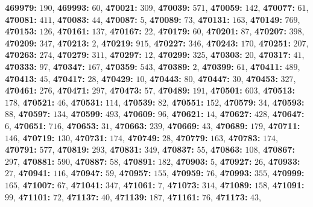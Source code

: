\textsf{\bfseries 469979:} $190$, \textsf{\bfseries 469993:} $60$, \textsf{\bfseries 470021:} $309$, \textsf{\bfseries 470039:} $571$, \textsf{\bfseries 470059:} $142$, \textsf{\bfseries 470077:} $61$, \textsf{\bfseries 470081:} $411$, \textsf{\bfseries 470083:} $44$, \textsf{\bfseries 470087:} $5$, \textsf{\bfseries 470089:} $73$, \textsf{\bfseries 470131:} $163$, \textsf{\bfseries 470149:} $769$, \textsf{\bfseries 470153:} $126$, \textsf{\bfseries 470161:} $137$, \textsf{\bfseries 470167:} $22$, \textsf{\bfseries 470179:} $60$, \textsf{\bfseries 470201:} $87$, \textsf{\bfseries 470207:} $398$, \textsf{\bfseries 470209:} $347$, \textsf{\bfseries 470213:} $2$, \textsf{\bfseries 470219:} $915$, \textsf{\bfseries 470227:} $346$, \textsf{\bfseries 470243:} $170$, \textsf{\bfseries 470251:} $207$, \textsf{\bfseries 470263:} $274$, \textsf{\bfseries 470279:} $311$, \textsf{\bfseries 470297:} $12$, \textsf{\bfseries 470299:} $325$, \textsf{\bfseries 470303:} $20$, \textsf{\bfseries 470317:} $41$, \textsf{\bfseries 470333:} $97$, \textsf{\bfseries 470347:} $167$, \textsf{\bfseries 470359:} $543$, \textsf{\bfseries 470389:} $2$, \textsf{\bfseries 470399:} $61$, \textsf{\bfseries 470411:} $489$, \textsf{\bfseries 470413:} $45$, \textsf{\bfseries 470417:} $28$, \textsf{\bfseries 470429:} $10$, \textsf{\bfseries 470443:} $80$, \textsf{\bfseries 470447:} $30$, \textsf{\bfseries 470453:} $327$, \textsf{\bfseries 470461:} $276$, \textsf{\bfseries 470471:} $297$, \textsf{\bfseries 470473:} $57$, \textsf{\bfseries 470489:} $191$, \textsf{\bfseries 470501:} $603$, \textsf{\bfseries 470513:} $178$, \textsf{\bfseries 470521:} $46$, \textsf{\bfseries 470531:} $114$, \textsf{\bfseries 470539:} $82$, \textsf{\bfseries 470551:} $152$, \textsf{\bfseries 470579:} $34$, \textsf{\bfseries 470593:} $88$, \textsf{\bfseries 470597:} $134$, \textsf{\bfseries 470599:} $493$, \textsf{\bfseries 470609:} $96$, \textsf{\bfseries 470621:} $14$, \textsf{\bfseries 470627:} $428$, \textsf{\bfseries 470647:} $6$, \textsf{\bfseries 470651:} $716$, \textsf{\bfseries 470653:} $31$, \textsf{\bfseries 470663:} $239$, \textsf{\bfseries 470669:} $43$, \textsf{\bfseries 470689:} $179$, \textsf{\bfseries 470711:} $146$, \textsf{\bfseries 470719:} $130$, \textsf{\bfseries 470731:} $174$, \textsf{\bfseries 470749:} $28$, \textsf{\bfseries 470779:} $163$, \textsf{\bfseries 470783:} $174$, \textsf{\bfseries 470791:} $577$, \textsf{\bfseries 470819:} $293$, \textsf{\bfseries 470831:} $349$, \textsf{\bfseries 470837:} $55$, \textsf{\bfseries 470863:} $108$, \textsf{\bfseries 470867:} $297$, \textsf{\bfseries 470881:} $590$, \textsf{\bfseries 470887:} $58$, \textsf{\bfseries 470891:} $182$, \textsf{\bfseries 470903:} $5$, \textsf{\bfseries 470927:} $26$, \textsf{\bfseries 470933:} $27$, \textsf{\bfseries 470941:} $116$, \textsf{\bfseries 470947:} $59$, \textsf{\bfseries 470957:} $155$, \textsf{\bfseries 470959:} $76$, \textsf{\bfseries 470993:} $355$, \textsf{\bfseries 470999:} $165$, \textsf{\bfseries 471007:} $67$, \textsf{\bfseries 471041:} $347$, \textsf{\bfseries 471061:} $7$, \textsf{\bfseries 471073:} $314$, \textsf{\bfseries 471089:} $158$, \textsf{\bfseries 471091:} $99$, \textsf{\bfseries 471101:} $72$, \textsf{\bfseries 471137:} $40$, \textsf{\bfseries 471139:} $187$, \textsf{\bfseries 471161:} $76$, \textsf{\bfseries 471173:} $43$, 
